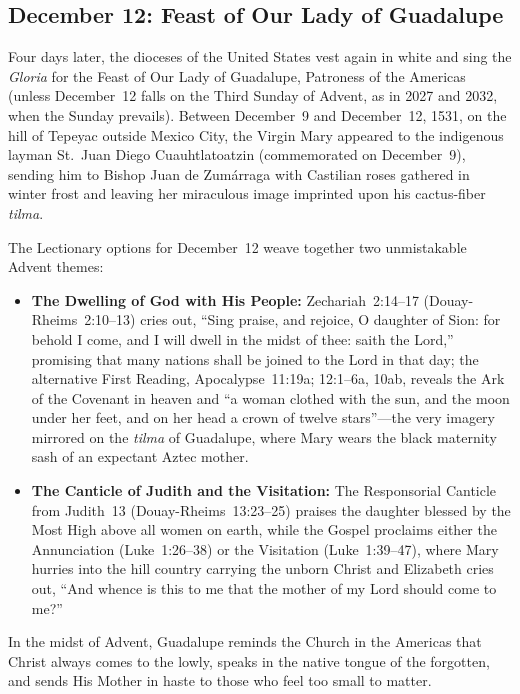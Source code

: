 \subsection{December 12: Feast of Our Lady of Guadalupe}

Four days later, the dioceses of the United States vest again in white and sing the \textit{Gloria} for the Feast of Our Lady of Guadalupe, Patroness of the Americas (unless December~12 falls on the Third Sunday of Advent, as in 2027 and 2032, when the Sunday prevails). Between December~9 and December~12, 1531, on the hill of Tepeyac outside Mexico City, the Virgin Mary appeared to the indigenous layman St.~Juan Diego Cuauhtlatoatzin (commemorated on December~9), sending him to Bishop Juan de Zum\'arraga with Castilian roses gathered in winter frost and leaving her miraculous image imprinted upon his cactus-fiber \textit{tilma}.

The Lectionary options for December~12 weave together two unmistakable Advent themes:

\begin{itemize}
  \item \textbf{The Dwelling of God with His People:} Zechariah~2:14--17 (Douay-Rheims~2:10--13) cries out, ``Sing praise, and rejoice, O daughter of Sion: for behold I come, and I will dwell in the midst of thee: saith the Lord,'' promising that many nations shall be joined to the Lord in that day; the alternative First Reading, Apocalypse~11:19a; 12:1--6a, 10ab, reveals the Ark of the Covenant in heaven and ``a woman clothed with the sun, and the moon under her feet, and on her head a crown of twelve stars''---the very imagery mirrored on the \textit{tilma} of Guadalupe, where Mary wears the black maternity sash of an expectant Aztec mother.
  \item \textbf{The Canticle of Judith and the Visitation:} The Responsorial Canticle from Judith~13 (Douay-Rheims~13:23--25) praises the daughter blessed by the Most High above all women on earth, while the Gospel proclaims either the Annunciation (Luke~1:26--38) or the Visitation (Luke~1:39--47), where Mary hurries into the hill country carrying the unborn Christ and Elizabeth cries out, ``And whence is this to me that the mother of my Lord should come to me?''
\end{itemize}

In the midst of Advent, Guadalupe reminds the Church in the Americas that Christ always comes to the lowly, speaks in the native tongue of the forgotten, and sends His Mother in haste to those who feel too small to matter.

